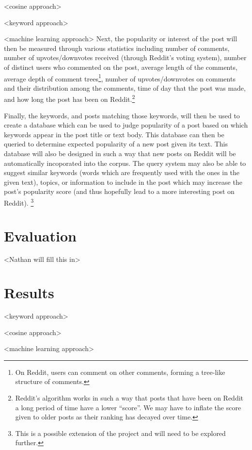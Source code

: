 \documentclass{acm_proc_article-sp}
\begin{document}
<cosine approach>

<keyword approach>

<machine learning approach>
Next, the popularity or interest of the post will then be measured through various statistics including
number of comments, number of upvotes/downvotes received (through Reddit's voting system), number
of distinct users who commented on the post, average length of the comments, average depth of
comment trees\footnote{On Reddit, users can comment on other comments, forming a tree-like structure of comments.},
number of upvotes/downvotes on comments and their distribution among the comments, time of day that the post was made,
and how long the post has been on Reddit.\footnote{Reddit's algorithm works in such a way that posts that have been on Reddit
a long period of time have a lower ``score''. We may have to inflate the score given to older posts as their ranking
has decayed over time.}

Finally, the keywords, and posts matching those keywords, will then be used to create a database which
can be used to judge popularity of a post based on which keywords appear in the post title or text
body.  This database can then be queried to determine expected popularity of a new post given its
text.  This database will also be designed in such a way that new posts on Reddit will be automatically
incoporated into the corpus.
The query system may also be able to suggest similar keywords (words which are frequently used with
the ones in the given text), topics, or information to include in the post which may increase
the post's popularity score (and thus hopefully lead to a more interesting post on Reddit).
\footnote{This is a possible extension of the project and will need to be explored further.}

\section{Evaluation}

<Nathan will fill this in>

\section{Results}

<keyword approach>

<cosine approach>

<machine learning approach>


\end{document}
